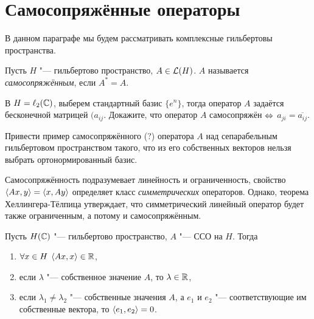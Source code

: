 \documentclass[main]{subfiles}
\begin{document}
\section{Самосопряжённые операторы}%

В данном параграфе мы будем рассматривать
комплексные гильбертовы пространства.

\begin{definition}
  Пусть $H$ "--- гильбертово пространство,
  $A \in \Linears{H}$. $A$ называется
  \emph{самосопряжённым}, если $A^* = A$.
\end{definition}

\begin{exercise}
  В \( H = \ell_2(\mathbb{C}) \),
  выберем стандартный базис \( \{ e^n \} \),
  тогда оператор \( A \) задаётся бесконечной матрицей
  \( (a_{ij} \). Докажите, что
  оператор \( A \) самосопряжён \( \Leftrightarrow \)
  \( a_{ji} = \overline{a_{ij}} \).
\end{exercise}

\begin{exercise}
  Привести пример самосопряжённого (?) оператора \( A \)
  над сепарабельным гильбертовом пространством такого,
  что из его собственных векторов нельзя выбрать
  ортонормированный базис.
\end{exercise}

\begin{remark}
  Самосопряжённость подразумевает линейность и ограниченность,
  свойство $\langle Ax, y \rangle = \langle x, Ay \rangle$ определяет класс
  \emph{симметрических} операторов.
  Однако, теорема Хеллингера-Тёлпица утверждает,
  что симметрический линейный оператор будет также ограниченным,
  а потому и самосопряжённым.
\end{remark}

\begin{theorem}%
  Пусть \( H(\mathbb{C}) \) "--- гильбертово пространство,
  \( A \) "--- ССО на \( H \). Тогда
  \begin{enumerate}
    \item \( \forall {x \in H} \; \, \langle Ax, x \rangle \in \mathbb{R} \),
    \item если \( \lambda \) "--- собственное значение \( A \),
      то \( \lambda \in \mathbb{R} \),
    \item если \( \lambda_1 \ne \lambda_2 \) "---
      собственные значения \( A \),
      а \( e_1 \) и \( e_2 \) "--- соответствующие им
      собственные вектора, то \( \langle e_1, e_2 \rangle = 0 \).
  \end{enumerate}
\end{theorem}
\end{document}
